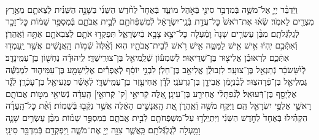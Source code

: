 \documentclass[twoside, openany, parskip=half, 11pt]{book}
\begin{document}
\begin{footnotesize}
\begin{multicols}{2}
\\
וַיְֿדַבֵּ֨ר יְיָ֧ אֶל־מֹשֶׁ֛ה בְּֿמִדְבַּ֥ר סִינַ֖י בְּֿאֹ֣הֶל מוֹעֵ֑ד בְּֿאֶחָד֩ לַחֹ֨דֶשׁ הַשֵּׁנִ֜י בַּשָּׁנָ֣ה הַשֵּׁנִ֗ית לְֿצֵאתָ֛ם מֵאֶ֥רֶץ מִצְרַ֖יִם לֵאמֹֽר׃ שְֿׂא֗וּ אֶת־רֹאשׁ֙ כׇּל־עֲדַ֣ת בְּֿנֵֽי־יִשְׂרָאֵ֔ל לְֿמִשְׁפְּֿחֹתָ֖ם לְֿבֵ֣ית אֲבֹתָ֑ם בְּֿמִסְפַּ֣ר שֵׁמ֔וֹת כׇּל־זָכָ֖ר לְֿגֻלְגְּֿלֹתָֽם׃ מִבֶּ֨ן עֶשְׂרִ֤ים שָׁנָה֙ וָמַ֔עְלָה כׇּל־יֹצֵ֥א צָבָ֖א בְּֿיִשְׂרָאֵ֑ל תִּפְקְד֥וּ אֹתָ֛ם לְֿצִבְאֹתָ֖ם אַתָּ֥ה וְֿאַֽהֲרֹֽן׃ וְֿאִתְּֿכֶ֣ם יִֽהְי֔וּ אִ֥ישׁ אִ֖ישׁ לַמַּטֶּ֑ה אִ֛ישׁ רֹ֥אשׁ לְֿבֵית־אֲבֹתָ֖יו הֽוּא׃  וְֿאֵ֨לֶּה֙ שְֿׁמ֣וֹת הָֽאֲנָשִׁ֔ים אֲשֶׁ֥ר יַֽעַמְד֖וּ אִתְּֿכֶ֑ם לִרְאוּבֵ֕ן אֱלִיצ֖וּר בֶּן־שְׁדֵיאֽוּר׃ לְֿשִׁמְע֕וֹן שְֿׁלֻֽמִיאֵ֖ל בֶּן־צוּרִֽישַׁדָּֽי׃ לִֽיהוּדָ֕ה נַחְשׁ֖וֹן בֶּן־עַמִּֽינָדָֽב׃ לְֿיִ֨שָּׂשׂכָ֔ר נְֿתַנְאֵ֖ל בֶּן־צוּעָֽר׃ לִזְבוּלֻ֕ן אֱלִיאָ֖ב בֶּן־חֵלֹֽן׃ לִבְנֵ֣י יוֹסֵ֔ף לְֿאֶפְרַ֕יִם אֱלִֽישָׁמָ֖ע בֶּן־עַמִּיה֑וּד לִמְנַשֶּׁ֕ה גַּמְלִיאֵ֖ל בֶּן־פְּֿדָהצֽוּר׃ לְֿבִ֨נְיָמִ֔ן אֲבִידָ֖ן בֶּן־גִּדְעֹנִֽי׃ לְֿדָ֕ן אֲחִיעֶ֖זֶר בֶּן־עַמִּֽישַׁדָּֽי׃ לְֿאָשֵׁ֕ר פַּגְעִיאֵ֖ל בֶּן־עָכְֿרָֽן׃ לְֿגָ֕ד אֶלְיָסָ֖ף בֶּן־דְּֿעוּאֵֽל׃ לְֿנַ֨פְתָּלִ֔י אֲחִירַ֖ע בֶּן־עֵינָֽן׃ אֵ֚לֶּה קְֿריּאֵ֣י [ק' קְֿרוּאֵ֣י] הָֽעֵדָ֔ה נְֿשִׂיאֵ֖י מַטּ֣וֹת אֲבוֹתָ֑ם רָאשֵׁ֛י אַלְפֵ֥י יִשְׂרָאֵ֖ל הֵֽם׃  וַיִּקַּ֥ח מֹשֶׁ֖ה וְֿאַֽהֲרֹ֑ן אֵ֚ת הָֽאֲנָשִׁ֣ים הָאֵ֔לֶּה אֲשֶׁ֥ר נִקְּֿב֖וּ בְּֿשֵׁמֽוֹת׃ וְֿאֵ֨ת כׇּל־הָֽעֵדָ֜ה הִקְהִ֗ילוּ בְּֿאֶחָד֙ לַחֹ֣דֶשׁ הַשֵּׁנִ֔י וַיִּתְיַֽלְד֥וּ עַל־מִשְׁפְּֿחֹתָ֖ם לְֿבֵ֣ית אֲבֹתָ֑ם בְּֿמִסְפַּ֣ר שֵׁמ֗וֹת מִבֶּ֨ן עֶשְׂרִ֥ים שָׁנָ֛ה וָמַ֖עְלָה לְֿגֻלְגְּֿלֹתָֽם׃ כַּֽאֲשֶׁ֛ר צִוָּ֥ה יְיָ֖ אֶת־מֹשֶׁ֑ה וַֽיִּפְקְדֵ֖ם בְּֿמִדְבַּ֥ר סִינָֽי׃


\end{multicols}
\end{footnotesize}
\end{document}
